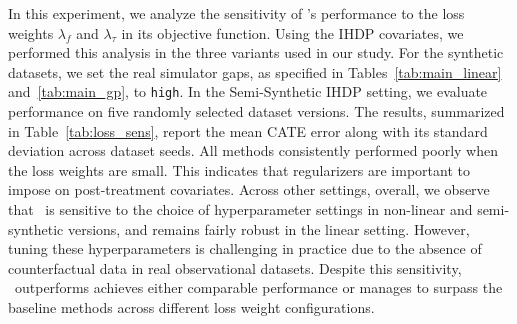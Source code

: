 \begin{table*}[ht]
\centering
\caption{\small{This table assesses the sensitivity of the loss weights on all three versions of the IHDP dataset considered in our work -- Synthetic Linear Sec.~\ref{sec:rq1}, Synthetic Non-Linear Sec.~\ref{sec:rq2}, and Semi-synthetic Sec.~\ref{sec:rq3}. We consider nine different settings of the loss weights in \our's objective~\ref{eq:overall_objective}. The table shows mean $\pm$ standard deviation of the CATE Error.}}
\label{tab:loss_sens}
\end{table*}
In this experiment, we analyze the sensitivity of \our's performance to the loss weights $\lambda_f$ and $\lambda_\tau$ in its objective function. Using the IHDP covariates, we performed this analysis in the three variants used in our study. For the synthetic datasets, we set the real simulator gaps, as specified in Tables~\ref{tab:main_linear} and~\ref{tab:main_gp}, to \verb|high|. In the Semi-Synthetic IHDP setting, we evaluate performance on five randomly selected dataset versions. The results, summarized in Table~\ref{tab:loss_sens}, report the mean CATE error along with its standard deviation across dataset seeds. All methods consistently performed poorly when the loss weights are small. This indicates that regularizers are important to impose on post-treatment covariates. Across other settings, overall, we observe that \our\ is sensitive to the choice of hyperparameter settings in non-linear and semi-synthetic versions, and remains fairly robust in the linear setting. However, tuning these hyperparameters is challenging in practice due to the absence of counterfactual data in real observational datasets. Despite this sensitivity, \our\ outperforms achieves either comparable performance or manages to surpass the baseline methods across different loss weight configurations.
